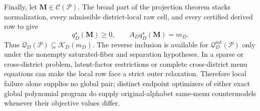 Finally, let \(\mathbf M\in\mathcal C(\mathcal P)\). The broad part of the projection theorem stacks normalization, every admissible district-local raw cell, and every certified derived row to give
\[
q_D^\star(\mathbf M)\geq0,
\qquad A_Dq_D^\star(\mathbf M)=m_D.
\]
Thus \(\mathcal Q_D(\mathcal P)\subseteq\mathcal K_D(m_D)\). The reverse inclusion is available for \(\mathcal Q_D^{\mathrm{sat}}(\mathcal P)\) only under the nonempty saturated-fiber and separation hypotheses. In a sparse or cross-district problem, latent-factor restrictions or complete cross-district menu equations can make the local row face a strict outer relaxation. Therefore local failure alone supplies no global pair; distinct endpoint optimizers of either exact global polynomial program do supply original-alphabet same-menu countermodels whenever their objective values differ.